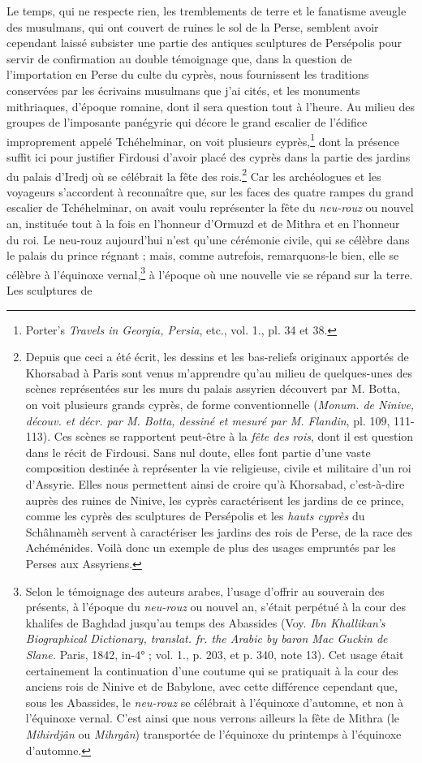 \documentclass[a4paper, 11pt, oneside, polutonikogreek, french]{article}
\begin{document}
Le temps, qui ne respecte rien, les tremblements de terre et le fanatisme aveugle des musulmans, qui ont couvert de ruines le sol de la Perse, semblent avoir cependant laissé subsister une partie des antiques sculptures de Persépolis pour servir de confirmation au double témoignage que, dans la question de l'importation en Perse du culte du cyprès, nous fournissent les traditions conservées par les écrivains musulmans que j'ai cités, et les monuments mithriaques, d'époque romaine, dont il sera question tout à l'heure. Au milieu des groupes de l'imposante panégyrie qui décore le grand escalier de l'édifice improprement appelé Tchéhelminar, on voit plusieurs cyprès,\footnote{Porter's \emph{Travels in Georgia, Persia}, etc., vol. 1., pl. 34 et 38.} dont la présence suffit ici pour justifier Firdousi d'avoir placé des cyprès dans la partie des jardins du palais d'Iredj où se célébrait la fête des rois.\footnote{Depuis que ceci a été écrit, les dessins et les bas-reliefs originaux apportés de Khorsabad à Paris sont venus m'apprendre qu'au milieu de quelques-unes des scènes représentées sur les murs du palais assyrien découvert par M. Botta, on voit plusieurs grands cyprès, de forme conventionnelle (\emph{Monum. de Ninive, découv. et décr. par M. Botta, dessiné et mesuré par M. Flandin}, pl. 109, 111-113). Ces scènes se rapportent peut-être à la \emph{fête des rois}, dont il est question dans le récit de Firdousi. Sans nul doute, elles font partie d'une vaste composition destinée à représenter la vie religieuse, civile et militaire d'un roi d'Assyrie. Elles nous permettent ainsi de croire qu'à Khorsabad, c'est-à-dire auprès des ruines de Ninive, les cyprès caractérisent les jardins de ce prince, comme les cyprès des sculptures de Persépolis et les \emph{hauts cyprès} du Schâhnamèh servent à caractériser les jardins des rois de Perse, de la race des Achéménides. Voilà donc un exemple de plus des usages empruntés par les Perses aux Assyriens.} Car les archéologues et les voyageurs s'accordent à reconnaître que, sur les faces des quatre rampes du grand escalier de Tchéhelminar, on avait voulu représenter la fête du \emph{neu-rouz} ou nouvel an, instituée tout à la fois en l'honneur d'Ormuzd et de Mithra et en l'honneur du roi. Le neu-rouz aujourd'hui n'est qu'une cérémonie civile, qui se célèbre dans le palais du prince régnant ; mais, comme autrefois, remarquons-le bien, elle se célèbre à l'équinoxe vernal,\footnote{Selon le témoignage des auteurs arabes, l'usage d'offrir au souverain des présents, à l'époque du \emph{neu-rouz} ou nouvel an, s'était perpétué à la cour des khalifes de Baghdad jusqu'au temps des Abassides (Voy. \emph{Ibn Khallikan's Biographical Dictionary, translat. fr. the Arabic by baron Mac Guckin de Slane.} Paris, 1842, in-4° ; vol. 1., p. 203, et p. 340, note 13). Cet usage était certainement la continuation d'une coutume qui se pratiquait à la cour des anciens rois de Ninive et de Babylone, avec cette différence cependant que, sous les Abassides, le \emph{neu-rouz} se célébrait à l'équinoxe d'automne, et non à l'équinoxe vernal. C'est ainsi que nous verrons ailleurs la fête de Mithra (le \emph{Mihirdjân} ou \emph{Mihrgân}) transportée de l'équinoxe du printemps à l'équinoxe d'automne.} à l'époque où une nouvelle vie se répand sur la terre. Les sculptures de 
\end{document}
